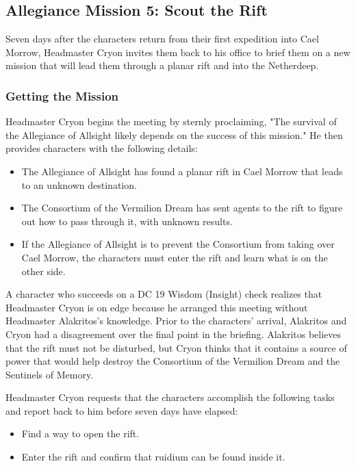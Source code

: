 \documentclass[10pt,a4paper,twoside,bg=print,twocolumn,openany,nodeprecatedcode]{dndbook}
\begin{document}
\subsection{Allegiance Mission 5: Scout the Rift}
Seven days after the characters return from their first expedition into Cael Morrow, Headmaster Cryon invites them back to his office to brief them on a new mission that will lead them through a planar rift and into the Netherdeep.

\subsubsection{Getting the Mission}
Headmaster Cryon begins the meeting by sternly proclaiming, "The survival of the Allegiance of Allsight likely depends on the success of this mission." He then provides characters with the following details:


\begin{itemize}
\item The Allegiance of Allsight has found a planar rift in Cael Morrow that leads to an unknown destination.
\item The Consortium of the Vermilion Dream has sent agents to the rift to figure out how to pass through it, with unknown results.
\item If the Allegiance of Allsight is to prevent the Consortium from taking over Cael Morrow, the characters must enter the rift and learn what is on the other side.
\end{itemize}

A character who succeeds on a DC 19 Wisdom (Insight) check realizes that Headmaster Cryon is on edge because he arranged this meeting without Headmaster Alakritos's knowledge. Prior to the characters' arrival, Alakritos and Cryon had a disagreement over the final point in the briefing. Alakritos believes that the rift must not be disturbed, but Cryon thinks that it contains a source of power that would help destroy the Consortium of the Vermilion Dream and the Sentinels of Memory.

Headmaster Cryon requests that the characters accomplish the following tasks and report back to him before seven days have elapsed:


\begin{itemize}
\item Find a way to open the rift.
\item Enter the rift and confirm that ruidium can be found inside it.
\end{itemize}
\end{document}
